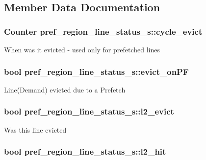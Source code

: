 \subsection{Member Data Documentation}
\hypertarget{structpref__region__line__status__s_aaf238eaba3fec92c5e4a1a4e6e25c1e7}{
\subsubsection[{cycle\_\-evict}]{\setlength{\rightskip}{0pt plus 5cm}Counter {\bf pref\_\-region\_\-line\_\-status\_\-s::cycle\_\-evict}}}
\label{structpref__region__line__status__s_aaf238eaba3fec92c5e4a1a4e6e25c1e7}
When was it evicted -\/ used only for prefetched lines \hypertarget{structpref__region__line__status__s_ac2e89200cbe091e9f64362565759c169}{
\subsubsection[{evict\_\-onPF}]{\setlength{\rightskip}{0pt plus 5cm}bool {\bf pref\_\-region\_\-line\_\-status\_\-s::evict\_\-onPF}}}
\label{structpref__region__line__status__s_ac2e89200cbe091e9f64362565759c169}
Line(Demand) evicted due to a Prefetch \hypertarget{structpref__region__line__status__s_ae765928b442bb6d0bad36a21bdecb7fb}{
\subsubsection[{l2\_\-evict}]{\setlength{\rightskip}{0pt plus 5cm}bool {\bf pref\_\-region\_\-line\_\-status\_\-s::l2\_\-evict}}}
\label{structpref__region__line__status__s_ae765928b442bb6d0bad36a21bdecb7fb}
Was this line evicted \hypertarget{structpref__region__line__status__s_a3a792d0fa5a569885b3140dc6e7bb4cf}{
\subsubsection[{l2\_\-hit}]{\setlength{\rightskip}{0pt plus 5cm}bool {\bf pref\_\-region\_\-line\_\-status\_\-s::l2\_\-hit}}}
